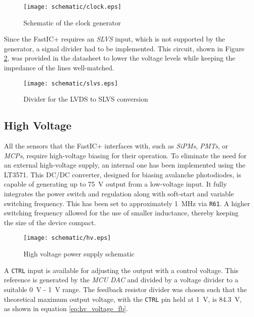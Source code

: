 \FloatBarrier
\begin{figure}[htp!]
    \centering
    \texttt{[image: schematic/clock.eps]}
    \caption{Schematic of the clock generator}
    \label{fig:schem_clock}
\end{figure}
\FloatBarrier

Since the FastIC+ requires an \emph{SLVS} input, which is not supported by the generator, a signal divider had to be implemented. This circuit, shown in Figure \ref{fig:schem_slvs}, was provided in the datasheet to lower the voltage levels while keeping the impedance of the lines well-matched.
\FloatBarrier
\begin{figure}[htp!]
    \centering
    \texttt{[image: schematic/slvs.eps]}
    \caption{Divider for the LVDS to SLVS conversion}
    \label{fig:schem_slvs}
\end{figure}
\FloatBarrier

\subsection{High Voltage}
All the sensors that the FastIC+ interfaces with, such as \emph{SiPMs}, \emph{PMTs}, or \emph{MCPs}, require high-voltage biasing for their operation. To eliminate the need for an external high-voltage supply, an internal one has been implemented using the LT3571. This DC/DC converter, designed for biasing avalanche photodiodes, is capable of generating up to \SI{75}{\volt} output from a low-voltage input. It fully integrates the power switch and regulation along with soft-start and variable switching frequency. This has been set to approximately \SI{1}{\mega\hertz} via \verb|R61|. A higher switching frequency allowed for the use of smaller inductance, thereby keeping the size of the device compact.

\FloatBarrier
\begin{figure}[htp!]
    \centering
    \texttt{[image: schematic/hv.eps]}
    \caption{High voltage power supply schematic}
    \label{fig:schem_hv}
\end{figure}
\FloatBarrier
A \verb|CTRL| input is available for adjusting the output with a control voltage. This reference is generated by the \emph{MCU} \emph{DAC} and divided by a voltage divider to a suitable \SI{0}{V} - \SI{1}{V} range. The feedback resistor divider was chosen such that the theoretical maximum output voltage, with the \verb|CTRL| pin held at \SI{1}{\volt}, is \SI{84.3}{\volt}, as shown in equation \ref{eq:hv_voltage_fb}.

